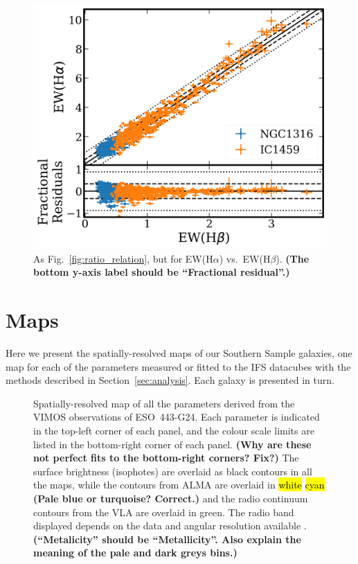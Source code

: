 \documentclass[a4paper,fleqn,usenatbib]{mnras}
\DeclareRobustCommand{\removed}[1]{{\sethlcolor{red}\hl{#1}}}
\DeclareRobustCommand{\added}[1]{{\sethlcolor{green}\hl{#1}}}
\begin{document}
\begin{figure}
  \includegraphics[width=\columnwidth]{EQw_fit.png}
  \caption[EW(H$\alpha$) vs.\ EW(H$\beta$)]{As
    Fig.~\ref{fig:ratio_relation}, but for EW(H$\alpha$) vs.\
    EW(H$\beta$). {\bf (The bottom y-axis label should be ``Fractional
      residual''.)}}
  \label{fig:EqW_relation}
\end{figure}

\section{Maps}
\label{sec:maps}

Here we present the spatially-resolved maps of our Southern Sample
galaxies, one map for each of the parameters measured or fitted to the
IFS datacubes with the methods described in
Section~\ref{sec:analysis}. Each galaxy is presented in turn.

\begin{figure}
  \centering
  \caption{Spatially-resolved map of all the parameters derived from
    the VIMOS observations of ESO~443-G24. Each parameter is indicated
    in the top-left corner of each panel, and the colour scale limits
    are listed in the bottom-right corner of each panel. {\bf (Why are
      these not perfect fits to the bottom-right corners? Fix?)} The
    surface brightness (isophotes) are overlaid as black contours in
    all the maps, while the \ce{^{12}CO(2-1)} contours from ALMA are
    overlaid in \removed{white} \added{cyan} {\bf (Pale blue or 
    turquoise? Correct.)} and the
    radio continuum contours from the VLA are overlaid in green. The
    radio band displayed depends on the data and angular resolution
    available \citep[see][]{ruffa2019, ruffa2020}. {\bf
      (``Metalicity'' should be ``Metallicity''. Also explain the
      meaning of the pale and dark greys bins.)}}
  \label{fig:eso443}
\end{figure}
\end{document}
